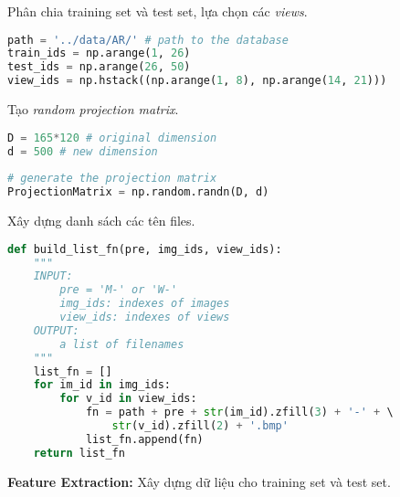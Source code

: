  
Phân chia training set và test set, lựa chọn các \textit{views}. 
 
\begin{lstlisting}[language=Python]
path = '../data/AR/' # path to the database  
train_ids = np.arange(1, 26) 
test_ids = np.arange(26, 50) 
view_ids = np.hstack((np.arange(1, 8), np.arange(14, 21))) 
\end{lstlisting}
 
Tạo \textit{random projection matrix}.  
 
 
\begin{lstlisting}[language=Python]
D = 165*120 # original dimension  
d = 500 # new dimension  
 
# generate the projection matrix  
ProjectionMatrix = np.random.randn(D, d)  
\end{lstlisting}
 
Xây dựng danh sách các tên files. 
 
\begin{lstlisting}[language=Python]
def build_list_fn(pre, img_ids, view_ids): 
    """ 
    INPUT: 
        pre = 'M-' or 'W-' 
        img_ids: indexes of images 
        view_ids: indexes of views 
    OUTPUT: 
        a list of filenames  
    """ 
    list_fn = [] 
    for im_id in img_ids: 
        for v_id in view_ids: 
            fn = path + pre + str(im_id).zfill(3) + '-' + \ 
                str(v_id).zfill(2) + '.bmp' 
            list_fn.append(fn) 
    return list_fn  
\end{lstlisting}
 
\textbf{Feature Extraction:} Xây dựng dữ liệu cho training set và test set. 
 
